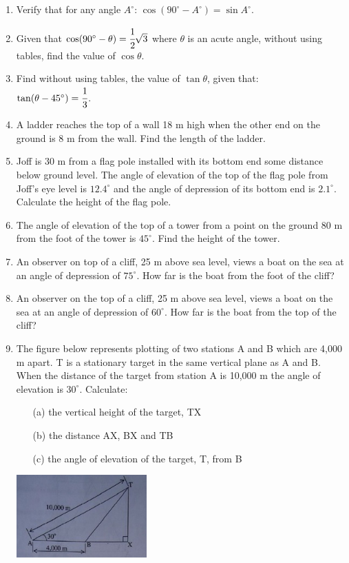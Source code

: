 \begin{enumerate}
	\item Verify that for any angle $A^\circ$: $\cos (90^\circ - A^\circ) = \sin A^\circ$.
	
	\item Given that $\cos (90^\circ - \theta) = \cfrac{1}{2}\sqrt{3}$ where $\theta$ is an acute angle, without using tables, find the value of $\cos \theta$.
	
	\item Find without using tables, the value of $\tan \theta$, given that: \\
	$\tan (\theta - 45^\circ) = \cfrac{1}{3}$.
	
	\item A ladder reaches the top of a wall 18 m high when the other end on the ground is 8 m from the wall. Find the length of the ladder.

	\item Joff is 30 m from a flag pole installed with its bottom end some distance below ground level. The angle of elevation of the top of the flag pole from Joff's eye level is $12.4^\circ$ and the angle of depression of its bottom end is $2.1^\circ$. Calculate the height of the flag pole.
	
	\item The angle of elevation of the top of a tower from a point on the ground 80 m from the foot of the tower is $45^\circ$. Find the height of the tower.
	
	\item An observer on top of a cliff, 25 m above sea level, views a boat on the sea at an angle of depression of $75^\circ$. How far is the boat from the foot of the cliff?
	
	\item An observer on the top of a cliff, 25 m above sea level, views a boat on the sea at an angle of depression of $60^\circ$. How far is the boat from the top of the cliff?
	
	\item The figure below represents plotting of two stations A and B which are 4,000 m apart. T is a stationary target in the same vertical plane as A and B. When the distance of the target from station A is 10,000 m the angle of elevation is $30^\circ$. Calculate:
		\begin{itemize}
		\item[(a)] the vertical height of the target, TX
		\item[(b)] the distance AX, BX and TB
		\item[(c)] the angle of elevation of the target, T, from B
		\end{itemize}
	\begin{center}
	\includegraphics[width=5cm]{./img/trig3.jpg}
	\end{center}


\end{enumerate}
